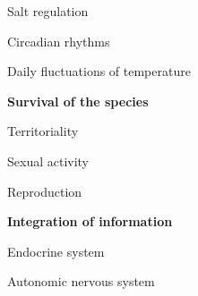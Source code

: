 \begin{coloredlist}
\begin{coloredlist}
\begin{coloredlist}
\begin{coloredlist}
                \item Salt regulation
            \end{coloredlist}
            \item {}
            \begin{coloredlist}
                \item Circadian rhythms
                \item Daily fluctuations of temperature
            \end{coloredlist}
        \end{coloredlist}
        \item \textbf{Survival of the species}
        \begin{coloredlist}
            \item Territoriality
            \item Sexual activity
            \item Reproduction
        \end{coloredlist}
        \item \textbf{Integration of information}
        \begin{coloredlist}
            \item Endocrine system
            \item Autonomic nervous system
        \end{coloredlist}
    \end{coloredlist}



\end{coloredlist}
